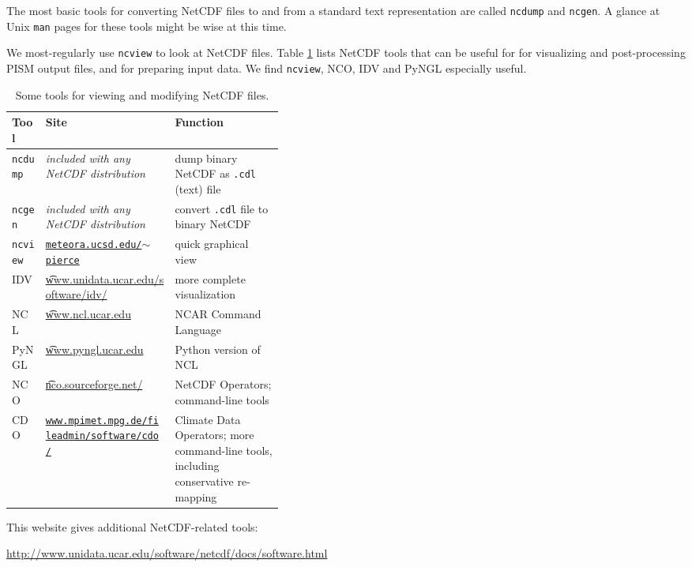 The most basic tools for converting NetCDF files to and from a standard text representation are called \texttt{ncdump} and \texttt{ncgen}.  A glance at Unix \texttt{man} pages for these tools might be wise at this time.

We most-regularly use \texttt{ncview} to look at NetCDF files.  Table \ref{tab:NetCDFview} lists NetCDF tools that can be useful for for visualizing and post-processing PISM output files, and for preparing input data.  We find \texttt{ncview}, NCO, IDV and PyNGL especially useful.

\newcommand{\netcdftool}[1]{#1\index{NetCDF!tools!#1}}
\begin{table}[ht]
\centering
\caption{Some tools for viewing and modifying NetCDF files.}\label{tab:NetCDFview} 
\small
\begin{tabular}{llp{0.4\linewidth}}
  \\\toprule
  \textbf{Tool} & \textbf{Site} & \textbf{Function}\\ \midrule
\netcdftool{\texttt{ncdump}} & \emph{included with any NetCDF distribution} & dump binary NetCDF as \texttt{.cdl} (text) file \\
\netcdftool{\texttt{ncgen}} & \emph{included with any NetCDF distribution} & convert \texttt{.cdl} file to binary NetCDF \\
\netcdftool{\texttt{ncview}} & \href{http://meteora.ucsd.edu/~pierce/ncview_home_page.html}{\texttt{meteora.ucsd.edu/$\sim$pierce}} & quick graphical view \\
\netcdftool{IDV} & \href{http://www.unidata.ucar.edu/software/idv/}{\t{www.unidata.ucar.edu/software/idv/}} & more complete visualization \\
\netcdftool{NCL} &  \href{http://www.ncl.ucar.edu}{\t{www.ncl.ucar.edu}} & NCAR Command Language\\
\netcdftool{PyNGL} &  \href{http://www.pyngl.ucar.edu}{\t{www.pyngl.ucar.edu}} & Python version of NCL\\
\netcdftool{NCO}\index{NCO (NetCDF Operators)} & \href{http://nco.sourceforge.net/}{\t{nco.sourceforge.net/}} & NetCDF Operators; command-line tools\\
\netcdftool{CDO} & \href{http://www.mpimet.mpg.de/fileadmin/software/cdo/}{\texttt{www.mpimet.mpg.de/fileadmin/software/cdo/}} & Climate Data Operators; more command-line tools, including conservative re-mapping
\\\bottomrule
\end{tabular}
\normalsize
\end{table}

This website gives additional NetCDF-related tools:

\centerline{ \url{http://www.unidata.ucar.edu/software/netcdf/docs/software.html} } 




